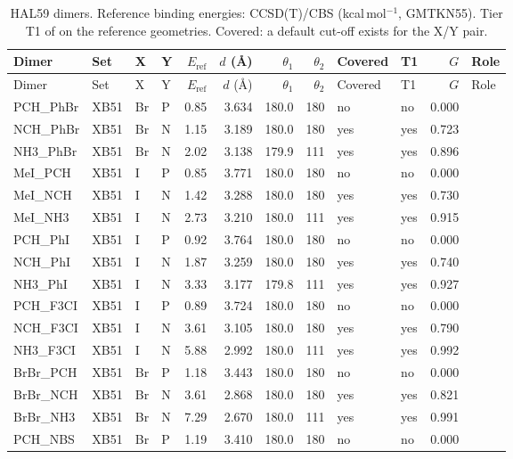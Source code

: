 {\scriptsize
\setlength{\tabcolsep}{3pt}
\begin{longtable}{llllrrrrllrl}
\caption{HAL59 dimers. Reference binding energies: CCSD(T)/CBS (kcal\,mol$^{-1}$, GMTKN55). Tier T1 of \BX{} on the reference geometries. Covered: a default cut-off exists for the X/Y pair.}\label{tab:hal59}\\
\toprule
Dimer & Set & X & Y & $E_\mathrm{ref}$ & $d$ (\AA) & $\theta_1$ & $\theta_2$ & Covered & T1 & $G$ & Role\\
\midrule
\endfirsthead
\toprule
Dimer & Set & X & Y & $E_\mathrm{ref}$ & $d$ (\AA) & $\theta_1$ & $\theta_2$ & Covered & T1 & $G$ & Role\\
\midrule
\endhead
\bottomrule
\endlastfoot
PCH\_PhBr & XB51 & Br & P & 0.85 & 3.634 & 180.0 & 180 & no & no & 0.000 & \\
NCH\_PhBr & XB51 & Br & N & 1.15 & 3.189 & 180.0 & 180 & yes & yes & 0.723 & \\
NH3\_PhBr & XB51 & Br & N & 2.02 & 3.138 & 179.9 & 111 & yes & yes & 0.896 & \\
MeI\_PCH & XB51 & I & P & 0.85 & 3.771 & 180.0 & 180 & no & no & 0.000 & \\
MeI\_NCH & XB51 & I & N & 1.42 & 3.288 & 180.0 & 180 & yes & yes & 0.730 & \\
MeI\_NH3 & XB51 & I & N & 2.73 & 3.210 & 180.0 & 111 & yes & yes & 0.915 & \\
PCH\_PhI & XB51 & I & P & 0.92 & 3.764 & 180.0 & 180 & no & no & 0.000 & \\
NCH\_PhI & XB51 & I & N & 1.87 & 3.259 & 180.0 & 180 & yes & yes & 0.740 & \\
NH3\_PhI & XB51 & I & N & 3.33 & 3.177 & 179.8 & 111 & yes & yes & 0.927 & \\
PCH\_F3CI & XB51 & I & P & 0.89 & 3.724 & 180.0 & 180 & no & no & 0.000 & \\
NCH\_F3CI & XB51 & I & N & 3.61 & 3.105 & 180.0 & 180 & yes & yes & 0.790 & \\
NH3\_F3CI & XB51 & I & N & 5.88 & 2.992 & 180.0 & 111 & yes & yes & 0.992 & \\
BrBr\_PCH & XB51 & Br & P & 1.18 & 3.443 & 180.0 & 180 & no & no & 0.000 & \\
BrBr\_NCH & XB51 & Br & N & 3.61 & 2.868 & 180.0 & 180 & yes & yes & 0.821 & \\
BrBr\_NH3 & XB51 & Br & N & 7.29 & 2.670 & 180.0 & 111 & yes & yes & 0.991 & \\
PCH\_NBS & XB51 & Br & P & 1.19 & 3.410 & 180.0 & 180 & no & no & 0.000 & \\

\end{longtable}}
